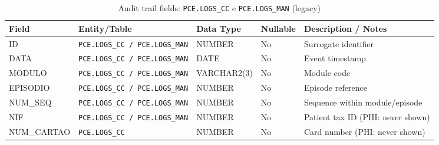 \begin{table}[H]
    \centering
    \caption{Audit trail fields: \texttt{PCE.LOGS\_CC} e \texttt{PCE.LOGS\_MAN} (legacy)}
    \label{tab:audit_logs_cc_man_fields}
    {\setlength{\tabcolsep}{4pt}\small\renewcommand{\arraystretch}{1.2}
    \begin{tabularx}{\textwidth}{@{}>{\raggedright\arraybackslash}p{3.2cm} >{\raggedright\arraybackslash}p{3.0cm} >{\raggedright\arraybackslash}p{2.2cm} >{\centering\arraybackslash}p{1.7cm} >{\raggedright\arraybackslash}X@{}}
        \toprule
        \textbf{Field} & \textbf{Entity/Table} & \textbf{Data Type} & \textbf{Nullable} & \textbf{Description / Notes} \\
        \midrule
        ID & \texttt{PCE.LOGS\_CC / PCE.LOGS\_MAN} & NUMBER & No & Surrogate identifier \\
        DATA & \texttt{PCE.LOGS\_CC / PCE.LOGS\_MAN} & DATE & No & Event timestamp \\
        MODULO & \texttt{PCE.LOGS\_CC / PCE.LOGS\_MAN} & VARCHAR2(3) & No & Module code \\
        EPISODIO & \texttt{PCE.LOGS\_CC / PCE.LOGS\_MAN} & NUMBER & No & Episode reference \\
        NUM\_SEQ & \texttt{PCE.LOGS\_CC / PCE.LOGS\_MAN} & NUMBER & No & Sequence within module/episode \\
        NIF & \texttt{PCE.LOGS\_CC / PCE.LOGS\_MAN} & NUMBER & No & Patient tax ID (PHI: never shown) \\
        NUM\_CARTAO & \texttt{PCE.LOGS\_CC} & NUMBER & No & Card number (PHI: never shown) \\
        \bottomrule
    \end{tabularx}}
\end{table}

